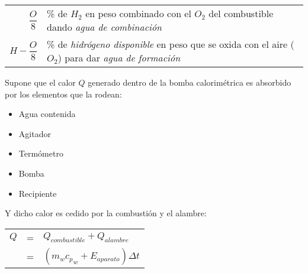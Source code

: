 \documentclass[11pt,a4paper]{article}
\begin{document}
\begin{multicols}{2}
\begin{cajita}
			\vspace{-.2cm}
			
			\vspace{.2cm}
			
			\begin{tabular}{r p{.7\linewidth}}
				$\dfrac{O}{8}$ & \% de $H_2$ en peso combinado con el $O_2$ del combustible dando \emph{agua de combinación}\\
				$H - \dfrac{O}{8}$ & \% de \emph{hidrógeno disponible} en peso que se oxida con el aire ($O_2$) para dar \emph{agua de formación}
			\end{tabular}
		\end{cajita}
	\end{multicols}
	
	\begin{cajita}
		
		
		\vspace{-.6cm}
		
		\begin{multicols}{2}
			\begin{flushleft}
				Supone que el calor $Q$ generado dentro de la bomba calorimétrica es absorbido por los elementos que la rodean:
				\begin{itemize}
					\item Agua contenida\\[.1cm]
					\item Agitador\\[.1cm]
					\item Termómetro\\[.1cm]
					\item Bomba\\[.1cm]
					\item Recipiente
				\end{itemize} 
			
				Y dicho calor es cedido por la combustión y el alambre:
			\end{flushleft} 
			\begin{tabular}{r c l}
				$Q$ & = & $Q_{combustible} + Q_{alambre}$\\[.2cm]
					& = & $\left(m_{w} {c_p}_{w} + E_{aparato}\right) \Delta t$\\[.2cm]
			\end{tabular}
			
			\columnbreak
			

\end{multicols}
\end{cajita}
\end{document}

